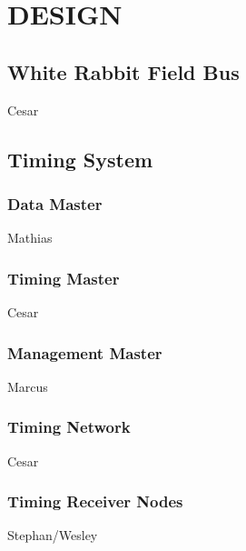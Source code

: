 \section{DESIGN}

\subsection{White Rabbit Field Bus}
Cesar
\subsection{Timing System}

\subsubsection{Data Master}
Mathias
\subsubsection{Timing Master}
Cesar
\subsubsection{Management Master}
Marcus
\subsubsection{Timing Network}
Cesar
\subsubsection{Timing Receiver Nodes}
Stephan/Wesley
